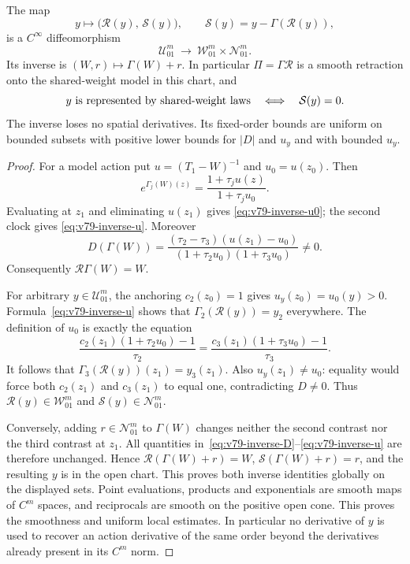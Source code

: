 \begin{theorem}
\label{thm:v79-split}
The map
\begin{equation}\label{eq:v79-split-map}
 y\longmapsto
 \bigl(\mathcal R(y),\,\mathcal S(y)\bigr),\qquad
 \mathcal S(y)=y-\Gamma(\mathcal R(y)),
\end{equation}
is a $C^\infty$ diffeomorphism
\[
 \mathcal U_{01}^m\ \longrightarrow\
              \mathcal W_{01}^m\times\mathcal N_{01}^m.
\]
Its inverse is $(W,r)\mapsto\Gamma(W)+r$.  In particular
$\Pi=\Gamma\mathcal R$ is a smooth retraction onto the
shared-weight model in this chart, and
\[
 y\hbox{ is represented by shared-weight laws}
           \quad\Longleftrightarrow\quad \mathcal S(y)=0.
\]
The inverse loses no spatial derivatives.  Its fixed-order bounds are
uniform on bounded subsets with positive lower bounds for $|D|$ and
$u_y$ and with bounded $u_y$.
\end{theorem}
\begin{proof}
For a model action put $u=(T_1-W)^{-1}$ and $u_0=u(z_0)$.  Then
\begin{equation}\label{eq:v79-rational-coordinate}
 e^{\Gamma_j(W)(z)}
           =\frac{1+\tau_j u(z)}{1+\tau_j u_0}.
\end{equation}
Evaluating at $z_1$ and eliminating $u(z_1)$ gives
\eqref{eq:v79-inverse-u0}; the second clock gives
\eqref{eq:v79-inverse-u}.  Moreover
\[
 D(\Gamma(W))=
 \frac{(\tau_2-\tau_3)(u(z_1)-u_0)}
 {(1+\tau_2u_0)(1+\tau_3u_0)}\ne0.
\]
Consequently $\mathcal R\Gamma(W)=W$.

For arbitrary $y\in\mathcal U_{01}^m$, the anchoring $c_2(z_0)=1$
gives $u_y(z_0)=u_0(y)>0$.  Formula~\eqref{eq:v79-inverse-u} shows
that $\Gamma_2(\mathcal R(y))=y_2$ everywhere.  The definition of
$u_0$ is exactly the equation
\[
 \frac{c_2(z_1)(1+\tau_2u_0)-1}{\tau_2}
   =\frac{c_3(z_1)(1+\tau_3u_0)-1}{\tau_3}.
\]
It follows that $\Gamma_3(\mathcal R(y))(z_1)=y_3(z_1)$.
Also $u_y(z_1)\ne u_0$: equality would force both $c_2(z_1)$ and
$c_3(z_1)$ to equal one, contradicting $D\ne0$.  Thus
$\mathcal R(y)\in\mathcal W_{01}^m$ and
$\mathcal S(y)\in\mathcal N_{01}^m$.

Conversely, adding $r\in\mathcal N_{01}^m$ to $\Gamma(W)$ changes
neither the second contrast nor the third contrast at $z_1$.
All quantities in~\eqref{eq:v79-inverse-D}--\eqref{eq:v79-inverse-u}
are therefore unchanged.  Hence $\mathcal R(\Gamma(W)+r)=W$,
$\mathcal S(\Gamma(W)+r)=r$, and the resulting $y$ is in the open
chart.  This proves both inverse identities globally on the displayed
sets.  Point evaluations, products and exponentials are smooth maps of
$C^m$ spaces, and reciprocals are smooth on the positive open cone.
This proves the smoothness and uniform local estimates.  In particular
no derivative of $y$ is used to recover an action derivative of the
same order beyond the derivatives already present in its $C^m$ norm.
\end{proof}

